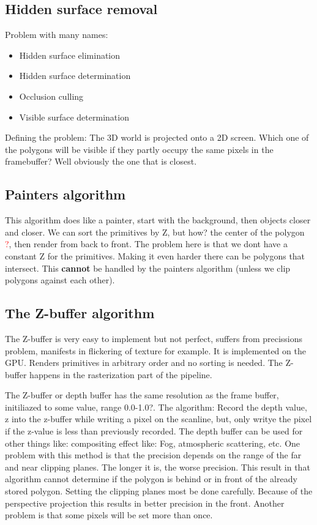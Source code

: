 	\subsection*{Hidden surface removal}
	Problem with many names:

		\begin{itemize}
			\item Hidden surface elimination
			\item Hidden surface determination
			\item Occlusion culling
			\item Visible surface determination
		\end{itemize}

	Defining the problem: The 3D world is projected onto a 2D screen. Which one of the polygons will be visible if they partly occupy the same pixels in the framebuffer? Well obviously the one that is closest. 

	\subsection*{Painters algorithm}
	This algorithm does like a painter, start with the background, then objects closer and closer. We can sort the primitives by Z, but how? the center of the polygon \textcolor{red}{?}, then render from back to front. The problem here is that we dont have a constant Z for the primitives. Making it even harder there can be polygons that intersect. This \textbf{cannot} be handled by the painters algorithm (unless we clip polygons against each other).  

	\subsection*{The Z-buffer algorithm}
	The Z-buffer is very easy to implement but not perfect, suffers from precissions problem, manifests in flickering of texture for example. It is implemented on the GPU. Renders primitives in arbitrary order and no sorting is needed. The Z-buffer happens in the rasterization part of the pipeline. 

	The Z-buffer or depth buffer has the same resolution as the frame buffer, initiliazed to some value, range 0.0-1.0?. The algorithm: Record the depth value, z into the z-buffer while writing a pixel on the scanline, but, only writye the pixel if the z-value is less than previously recorded. The depth buffer can be used for other things like: compositing effect like: Fog, atmospheric scattering, etc. One problem with this method is that the precision depends on the range of the far and near clipping planes. The longer it is, the worse precision. This result in that algorithm cannot determine if the polygon is behind or in front of the already stored polygon. Setting the clipping planes most be done carefully. Because of the perspective projection this results in better precision in the front. Another problem is that some pixels will be set more than once. 

